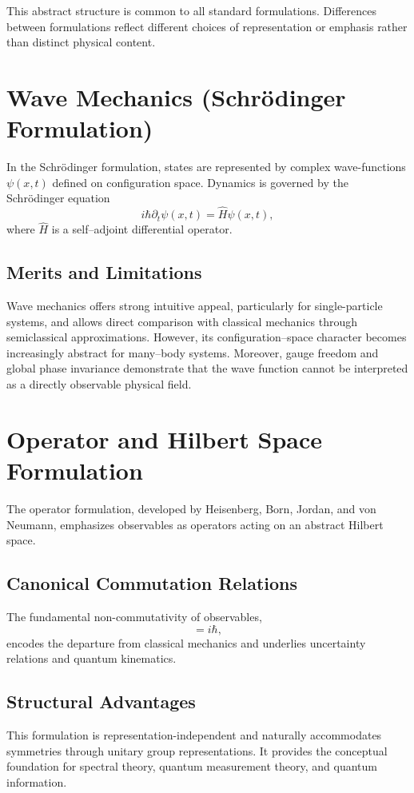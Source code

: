 This abstract structure is common to all standard formulations. 
Differences between formulations reflect different choices of 
representation or emphasis rather than distinct physical content.

\section{Wave Mechanics (Schrödinger Formulation)}

In the Schrödinger formulation, states are represented by complex wave-functions
$\psi(x,t)$ defined on configuration space. Dynamics is governed by the 
Schrödinger equation
\begin{equation}
 i\hbar \partial_t \psi(x,t) = \hat{H} \psi(x,t),
\end{equation}
where $\hat{H}$ is a self--adjoint differential operator.

\subsection{Merits and Limitations}

Wave mechanics offers strong intuitive appeal, particularly for single-particle 
systems, and allows direct comparison with classical mechanics through semiclassical 
approximations. However, its configuration--space character becomes increasingly 
abstract for many--body systems. Moreover, gauge freedom and global phase invariance 
demonstrate that the wave function cannot be interpreted as a directly 
observable physical field.

\section{Operator and Hilbert Space Formulation}
The operator formulation, developed by Heisenberg, Born, Jordan, and von Neumann,
emphasizes observables as operators acting on an abstract Hilbert space.
\subsection{Canonical Commutation Relations}
The fundamental non-commutativity of observables,
\begin{equation}
 [\hat{x}, \hat{p}] = i\hbar,
\end{equation}
encodes the departure from classical mechanics and underlies uncertainty 
relations and quantum kinematics.

\subsection{Structural Advantages}
This formulation is representation-independent and naturally accommodates symmetries
through unitary group representations. It provides the conceptual foundation for 
spectral theory, quantum measurement theory, and quantum information.

